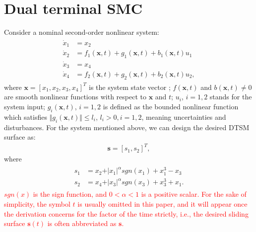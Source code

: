 \documentclass[3p]{elsarticle}
\theoremstyle{plain}
\theoremstyle{remark}
\begin{document}
\section{Dual terminal SMC}\label{sec:2}
Consider a nominal second-order nonlinear system:
\begin{align}
\begin{split}
\dot x_1 &= x_2\\
\dot x_2 &= f_1(\bm x,t)+g_1(\bm x,t)+b_1(\bm x,t)u_1\\
\dot x_3 &= x_4\\
\dot x_4 &= f_2(\bm x,t)+g_2(\bm x,t)+b_2(\bm x,t)u_2,\label{eq:second-order system}
\end{split}
\end{align}
where $\bm x = [x_1,x_2,x_3,x_4]^T$ is the system state vector ; $f(\bm x,t)$ and $b(\bm x,t)\neq 0$ are smooth nonlinear functions with respect to $\bm x$ and $t$; $u_i$, $i=1,2$ stands for the system input; $g_i(\bm x,t)$, $i=1,2$  is defined as the bounded nonlinear function which satisfies $\Vert g_i(\bm x,t)\Vert\le l_i$, $l_i>0, i=1,2$, meaning uncertainties and disturbances. For the system mentioned above, we can design the desired DTSM surface as:
\begin{align}
\bm s = [s_1,s_2]^T,
\end{align}
where
\begin{align}
\begin{split}
s_1 &= x_2+\vert x_1\vert^{\alpha} sgn(x_1)+x_1^3-x_3\\
s_2 &= x_4+\vert x_3\vert^{\alpha} sgn(x_3)+x_3^3+x_1.\label{eq:dual sliding surface}
\end{split}
\end{align}
\textcolor{red}{$sgn(x)$ is the sign function, and $0<\alpha<1$ is a positive scalar. For the sake of simplicity, the symbol $t$ is usually omitted in this paper, and it will appear once the derivation concerns for the factor of the time strictly, i.e., the desired sliding surface $\bm s(t)$ is often abbreviated as $\bm s$.}
\end{document}
